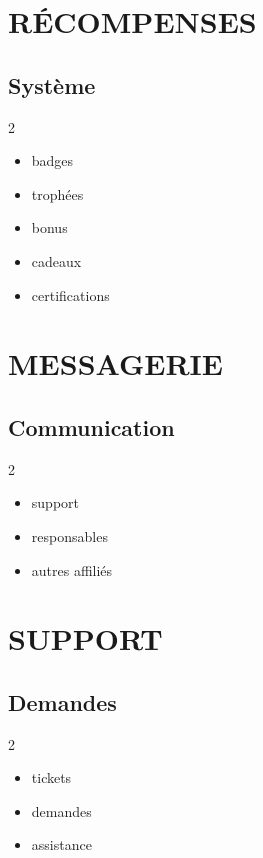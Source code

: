 \documentclass[12pt,a4paper,oneside]{book}
\begin{document}
\chapter{RÉCOMPENSES}

\section{Système}
\begin{multicols}{2}
\begin{itemize}
\item badges
\item trophées
\item bonus
\item cadeaux
\item certifications
\end{itemize}
\end{multicols}

\chapter{MESSAGERIE}

\section{Communication}
\begin{multicols}{2}
\begin{itemize}
\item support
\item responsables
\item autres affiliés
\end{itemize}
\end{multicols}

\chapter{SUPPORT}

\section{Demandes}
\begin{multicols}{2}
\begin{itemize}
\item tickets
\item demandes
\item assistance
\end{itemize}
\end{multicols}
\end{document}
